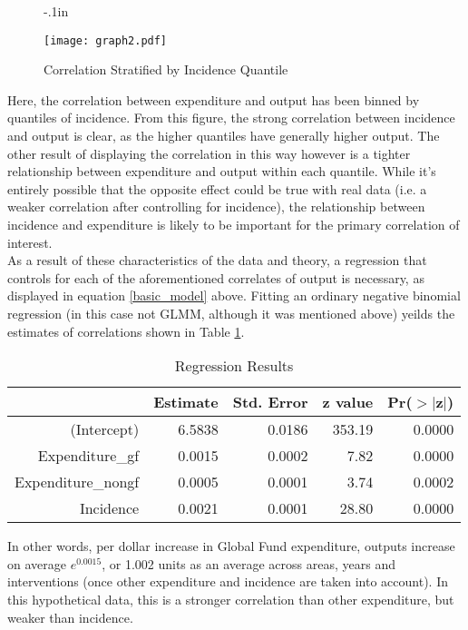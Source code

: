 \documentclass[twocolumn]{bmcart}%
\begin{document}
\begin{figure}[h]
  \advance\leftskip-.1in
  \caption{\textmd{Correlation Stratified by Incidence Quantile}}
  \texttt{[image: graph2.pdf]} \\
  \label{fig2}
\end{figure}

Here, the correlation between expenditure and output has been binned by quantiles of incidence. From this figure, the strong correlation between incidence and output is clear, as the higher quantiles have generally higher output. The other result of displaying the correlation in this way however is a tighter relationship between expenditure and output within each quantile. While it's entirely possible that the opposite effect could be true with real data (i.e. a weaker correlation after controlling for incidence), the relationship between incidence and expenditure is likely to be important for the primary correlation of interest. \\

As a result of these characteristics of the data and theory, a regression that controls for each of the aforementioned correlates of output is necessary, as displayed in equation \ref{basic_model} above. Fitting an ordinary negative binomial regression (in this case not GLMM, although it was mentioned above) yeilds the estimates of correlations shown in Table \ref{regtable}.

\begin{table}[ht]
  \caption{Regression Results}
  \label{regtable}
\centering
\begin{tabular}{rrrrr}
  \hline
 & Estimate & Std. Error & z value & Pr($>$$|$z$|$) \\
  \hline
(Intercept) & 6.5838 & 0.0186 & 353.19 & 0.0000 \\
  Expenditure\_gf & 0.0015 & 0.0002 & 7.82 & 0.0000 \\
  Expenditure\_nongf & 0.0005 & 0.0001 & 3.74 & 0.0002 \\
  Incidence & 0.0021 & 0.0001 & 28.80 & 0.0000 \\
   \hline
\end{tabular}
\end{table}

In other words, per dollar increase in Global Fund expenditure, outputs increase on average $e^{0.0015}$, or 1.002 units as an average across areas, years and interventions (once other expenditure and incidence are taken into account). In this hypothetical data, this is a stronger correlation than other expenditure, but weaker than incidence.
% 
\end{document}
